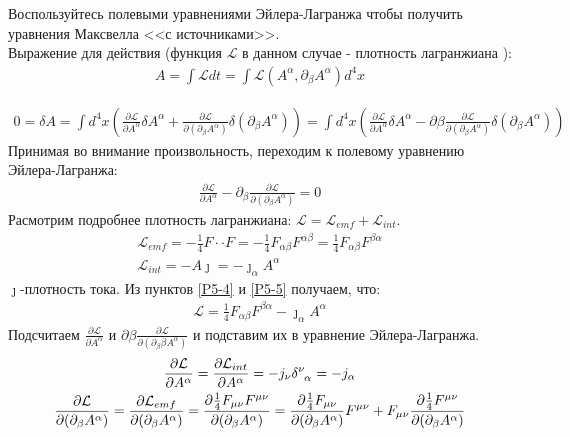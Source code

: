 \documentclass[__main__.tex]{subfiles}
\begin{document}
Воспользуйтесь полевыми уравнениями Эйлера-Лагранжа чтобы получить уравнения Максвелла <<с источниками>>.\\ 

	Выражение для действия (функция $\mathcal{L}$ в данном случае - плотность лагранжиана ): 
\begin{gather}
\label{P5-1}
A=\int \mathcal{L}dt=\int \mathcal{L}( A^{\alpha},\partial_\beta  A^{\alpha})d^4x
\end{gather}

\begin{gather}
\label{P5-2}
0=\delta A=
\int d^4x\left(
\frac{\partial \mathcal{L}}{\partial A^\alpha}\delta A^\alpha+\frac{\partial  \mathcal{L}}{\partial(\partial_\beta A^\alpha)}\delta(\partial_\beta A^\alpha)\right)=
\int d^4x(\frac{\partial \mathcal{L}}{\partial  A^\alpha}\delta A^\alpha-\partial\beta\frac{\partial  \mathcal{L}}{\partial(\partial_\beta A^\alpha)}\delta(\partial_\beta A^\alpha)) 
\end{gather}
Принимая во внимание произвольность, переходим к полевому уравнению Эйлера-Лагранжа: \\
\begin{gather}
\label{P5-3}
\frac{\partial \mathcal{L}}{\partial  A^\alpha}-\partial_\beta\frac{\partial  \mathcal{L}}{\partial(\partial_\beta A^\alpha)}=0
\end{gather}
Расмотрим подробнее плотность лагранжиана: $ \mathcal{L} = \mathcal{L}_{emf}+ \mathcal{L}_{int}.$\\
\begin{gather}
\label{P5-4}
\mathcal{L}_{emf}=-\frac{1}{4}F\cdot\cdot F=-\frac{1}{4}F_{\alpha\beta}F^{\alpha\beta}=\frac{1}{4}F_{\alpha\beta}F^{\beta\alpha}\\
\label{P5-5}
\mathcal{L}_{int}=- A\jmath=-\jmath_\alpha A^\alpha
\end{gather}
$\jmath$-плотность тока. Из пунктов \ref{P5-4} и \ref{P5-5} получаем, что:
\begin{gather}
\label{P5-6}
\mathcal{L}=\frac{1}{4}F_{\alpha\beta}F^{\beta\alpha}-\jmath_\alpha A^\alpha
\end{gather}
Подсчитаем $\frac{\partial \mathcal{L}}{\partial  A^\alpha}$ и $\partial\beta\frac{\partial  \mathcal{L}}{\partial(\partial_\beta\beta A^\alpha)}$ и подставим их в уравнение Эйлера-Лагранжа.
\begin{gather}
\label{P5-7}
\frac{\partial \mathcal{L}}{\partial A^\alpha}=
\frac{\partial \mathcal{L}_{int}}{\partial  A^\alpha}=
-j_\nu\delta\indices{^\nu_\alpha} = -j_\alpha\\
\label{P5-8}
\frac{\partial  \mathcal{L}}{\partial(\partial_\beta A^\alpha)}=\frac{\partial  \mathcal{L}_{emf}}{\partial(\partial_\beta A^\alpha)}=
\frac{\partial\frac{1}{4}F_{\mu\nu}F^{\mu\nu}}{\partial(\partial_\beta A^\alpha)} =
\frac{\partial\frac{1}{4}F_{\mu\nu}}{\partial(\partial_\beta A^\alpha)}F^{\mu\nu}+F_{\mu\nu}\frac{\partial\frac{1}{4}F^{\mu\nu}}{\partial(\partial_\beta A^\alpha)}
\end{gather}
\end{document}
